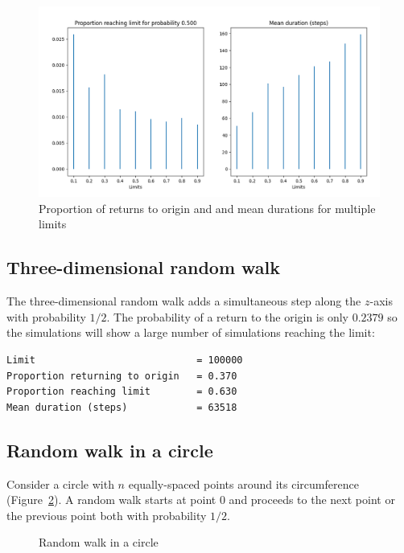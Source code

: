 \documentclass[11pt,a4paper]{article}
\begin{document}
\begin{figure}
\begin{center}
\includegraphics[width=\textwidth]{random-walk-02}
\caption{Proportion of returns to origin and and mean durations for multiple limits}\label{f.random-walk-2D}
\end{center}
\end{figure}

\subsection{Three-dimensional random walk}

The three-dimensional random walk adds a simultaneous step along the $z$-axis with probability $1/2$. The probability of a return to the origin is only $0.2379$ so the simulations will show a large number of simulations reaching the limit:

\begin{verbatim}
Limit                            = 100000
Proportion returning to origin   = 0.370
Proportion reaching limit        = 0.630
Mean duration (steps)            = 63518
\end{verbatim}

\subsection{Random walk in a circle}

Consider a circle with $n$ equally-spaced points around its circumference (Figure~\ref{f.random-walk-circle}). A random walk starts at point $0$ and proceeds to the next point or the previous point both with probability $1/2$.

\begin{figure}
\begin{center}
\end{center}
\caption{Random walk in a circle}\label{f.random-walk-circle}
\end{figure}
\end{document}
